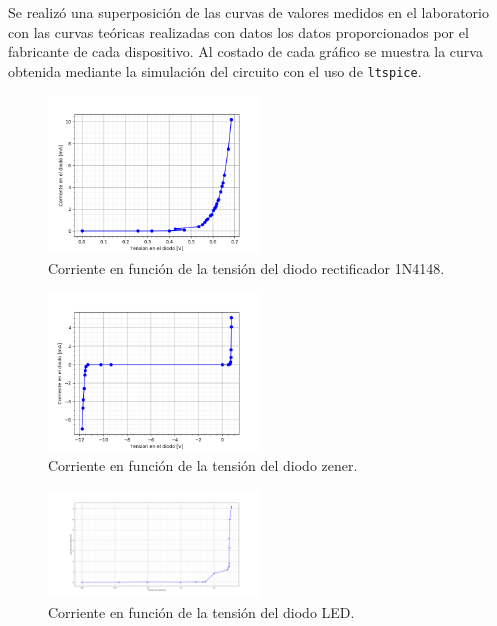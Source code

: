 \documentclass[a4paper]{article}
\begin{document}
Se realizó una superposición de las curvas de valores medidos en el laboratorio con las curvas teóricas realizadas con datos los datos proporcionados por el fabricante de cada dispositivo. Al costado de cada gráfico se muestra la curva obtenida mediante la simulación del circuito con el uso de \texttt{ltspice}.

\begin{figure}[H]
	\centering
	\includegraphics[width=0.5\textwidth]{CurvaDiodoRectificador.png}
	\caption{Corriente en función de la tensión del diodo rectificador 1N4148.}
	\label{fig:diodorect}
\end{figure}

\begin{figure}[H]
	\centering
	\includegraphics[width=0.5\textwidth]{CurvaZenerEntera.png}
	\caption{Corriente en función de la tensión del diodo zener.}
	\label{fig:diodozen}
\end{figure}

\begin{figure}[H]
	\centering
	\includegraphics[width=0.5\textwidth]{CurvaDiodosLed.png}
	\caption{Corriente en función de la tensión del diodo LED.}
	\label{fig:diodoled}
\end{figure}
\end{document}
